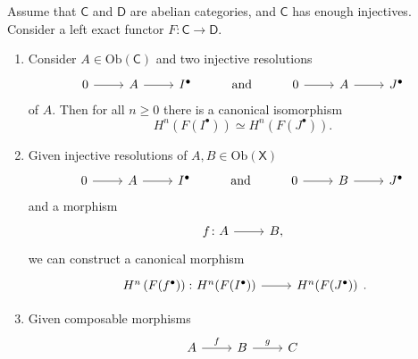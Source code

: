 \documentclass[../Main]{subfiles}
\begin{document}
\begin{prop}
	Assume that $\mathsf{C}$ and $\mathsf{D}$ are abelian categories,
	and $\mathsf{C}$ has enough injectives.
	Consider a left exact functor $F\colon \mathsf{C} \to \mathsf{D}$.
\begin{enumerate}
	\item 
	Consider $A \in \mathrm{Ob} \left(\mathsf{C}\right)$
	and two injective resolutions
	\begin{equation}
	\begin{tikzcd}
		0 \arrow[r, "", rightarrow] &
		A \arrow[r, "", rightarrow] &
		I^\bullet &
		\text{and} &
		0 \arrow[r, "", rightarrow] &
		A \arrow[r, "", rightarrow] &
		J^\bullet
	\end{tikzcd}
	\end{equation} 
	of $A$.
	Then for all $n \geq 0$ there is a canonical isomorphism
	\begin{equation}
		H^n(F(I^\bullet)) \simeq
		H^n(F(J^\bullet))
	.\end{equation} 
\item
	Given injective resolutions of $A, B \in \mathrm{Ob} \left(\mathsf{X}\right)$
	\begin{equation}
	\begin{tikzcd}
		0 \arrow[r, "", rightarrow] &
		A \arrow[r, "", rightarrow] &
		I^\bullet &
		\text{and} &
		0 \arrow[r, "", rightarrow] &
		B \arrow[r, "", rightarrow] &
		J^\bullet
	\end{tikzcd}
	\end{equation} 
	and a morphism
	\begin{equation}
	\begin{tikzcd}
		f\colon A \arrow[r, "", rightarrow] &
		B,
	\end{tikzcd}
	\end{equation} 
	we can construct a canonical morphism
	\begin{equation}
	\begin{tikzcd}
		H^{n} \left( F(f^\bullet) \right)\colon
		H^n(F(I^\bullet)) \arrow[r, "", rightarrow] &
		H^n(F(J^\bullet))
	\end{tikzcd}
	.\end{equation} 
\item
	Given composable morphisms
	\begin{equation}
	\begin{tikzcd}
		A \arrow[r, "f", rightarrow] &
		B \arrow[r, "g", rightarrow] &
		C
	\end{tikzcd}
	\end{equation} 

\end{enumerate}
\end{prop}
\end{document}
